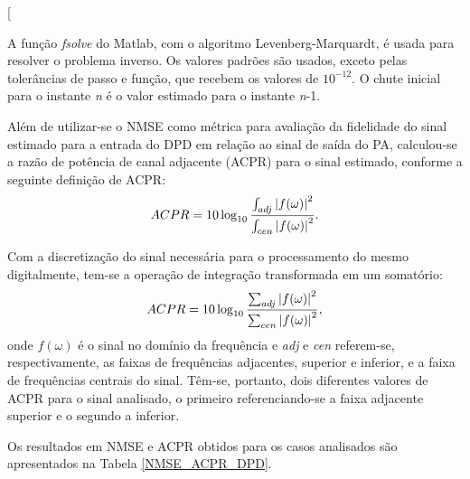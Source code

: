 \begin{table}[H]
\centering[
\caption{NMSE para os conjuntos de validação e de extração para a modelagem comportamental do PoD.}
\label{NMSE_PoD} 
\end{table}

A função \textit{fsolve} do Matlab, com o algoritmo Levenberg-Marquardt, é usada para resolver o problema inverso. Os valores padrões são usados, exceto pelas tolerâncias de passo e função, que recebem os valores de {$10^{-12}$}. O chute inicial para o instante \textit{n} é o valor estimado para o instante \textit{n}-1.

Além de utilizar-se o NMSE como métrica para avaliação da fidelidade do sinal estimado para a entrada do DPD em relação ao sinal de saída do PA, calculou-se a razão de potência de canal adjacente (ACPR) para o sinal estimado, conforme a seguinte definição de ACPR:
\begin{equation}
ACPR = 10\log_{10}\frac
{\int_{adj}\abs{f(\omega)}^{2}}
{\int_{cen}\abs{f(\omega)}^{2}}.
\end{equation}

{Com} a discretização do sinal necessária para o processamento do mesmo digitalmente, tem-se a operação de integração transformada em um somatório:
\begin{equation}
ACPR = 10\log_{10}\frac
{\sum_{adj}\abs{f(\omega)}^{2}}
{\sum_{cen}\abs{f(\omega)}^{2}},
\label{acprdisc}
\end{equation}
onde $f(\omega)$ é o sinal no domínio da frequência e \textit{adj} e \textit{cen} referem-se, respectivamente, as faixas de frequências adjacentes, superior e inferior, e a faixa de frequências centrais do sinal. Têm-se, portanto, dois diferentes valores de ACPR para o sinal analisado, o primeiro referenciando-se a faixa adjacente superior e o segundo a inferior.

Os resultados em NMSE e ACPR obtidos para os casos analisados são apresentados na Tabela \ref{NMSE_ACPR_DPD}.

